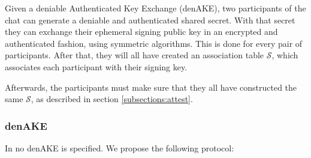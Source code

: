 Given a deniable Authenticated Key Exchange (denAKE), two participants of the chat can generate a deniable and authenticated shared secret. With that secret they can exchange their ephemeral signing public key in an encrypted and authenticated fashion, using symmetric algorithms. This is done for every pair of participants. After that, they will all have created an association table $\mathcal{S}$, which associates each participant with their signing key.

Afterwards, the participants must make sure that they all have constructed the same $\mathcal{S}$, as described in section \ref{subsections:attest}.

\subsubsection{denAKE}
In \cite{mpotr} no denAKE is specified. We propose the following protocol:


